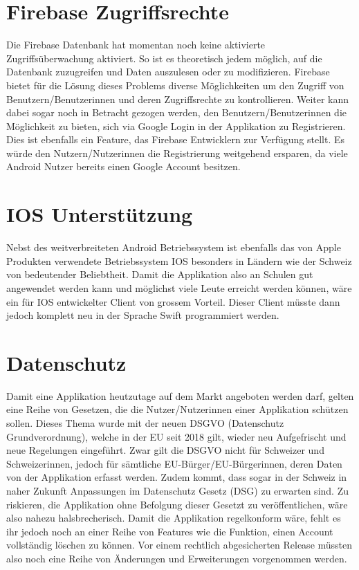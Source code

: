 \documentclass[a4paper,11pt]{report}
\begin{document}
		\section{Firebase Zugriffsrechte}
		Die Firebase Datenbank hat momentan noch keine aktivierte Zugriffsüberwachung aktiviert. So ist es theoretisch jedem möglich, auf die Datenbank zuzugreifen und Daten auszulesen oder zu modifizieren. Firebase bietet für die Lösung dieses Problems diverse Möglichkeiten um den Zugriff von Benutzern/Benutzerinnen und deren Zugriffsrechte zu kontrollieren. Weiter kann dabei sogar noch in Betracht gezogen werden, den Benutzern/Benutzerinnen die Möglichkeit zu bieten, sich via Google Login in der Applikation zu Registrieren. Dies ist ebenfalls ein Feature, das Firebase Entwicklern zur Verfügung stellt. Es würde den Nutzern/Nutzerinnen die Registrierung weitgehend ersparen, da viele Android Nutzer bereits einen Google Account besitzen.
		
		\section{IOS Unterstützung}
		Nebst des weitverbreiteten Android Betriebssystem ist ebenfalls das von Apple Produkten verwendete Betriebssystem IOS besonders in Ländern wie der Schweiz von bedeutender Beliebtheit. Damit die Applikation also an Schulen gut angewendet werden kann und möglichst viele Leute erreicht werden können, wäre ein für IOS entwickelter Client von grossem Vorteil. Dieser Client müsste dann jedoch komplett neu in der Sprache Swift programmiert werden.
		
		\section{Datenschutz}
		Damit eine Applikation heutzutage auf dem Markt angeboten werden darf, gelten eine Reihe von Gesetzen, die die Nutzer/Nutzerinnen einer Applikation schützen sollen.  Dieses Thema wurde mit der neuen DSGVO (Datenschutz Grundverordnung), welche in der EU seit 2018 gilt,  wieder neu Aufgefrischt und neue Regelungen eingeführt. Zwar gilt die DSGVO nicht für Schweizer und Schweizerinnen, jedoch für sämtliche EU-Bürger/EU-Bürgerinnen, deren Daten von der Applikation erfasst werden. Zudem kommt, dass sogar in der Schweiz in naher Zukunft Anpassungen im Datenschutz Gesetz (DSG) zu erwarten sind. Zu riskieren, die Applikation ohne Befolgung dieser Gesetzt zu veröffentlichen, wäre also nahezu halsbrecherisch. Damit die Applikation regelkonform wäre, fehlt es ihr jedoch noch an einer Reihe von Features wie die Funktion, einen Account vollständig löschen zu können. Vor einem rechtlich abgesicherten Release müssten also noch eine Reihe von Änderungen und Erweiterungen vorgenommen werden.
		
\end{document}
